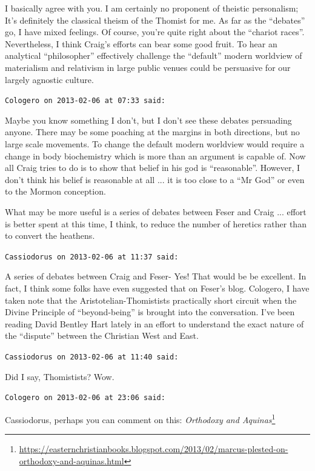 \begin{footnotesize}
\begin{sffamily}
I basically agree with you. I am certainly no proponent of theistic personalism; It's definitely the classical theism of the Thomist for me. As far as the ``debates'' go, I have mixed feelings. Of course, you're quite right about the ``chariot races''. Nevertheless, I think Craig's efforts can bear some good fruit. To hear an analytical ``philosopher'' effectively challenge the ``default'' modern worldview of materialism and relativism in large public venues could be persuasive for our largely agnostic culture.

\hfill

\texttt{Cologero on 2013-02-06 at 07:33 said:}

Maybe you know something I don't, but I don't see these debates persuading anyone. There may be some poaching at the margins in both directions, but no large scale movements. To change the default modern worldview would require a change in body biochemistry which is more than an argument is capable of. Now all Craig tries to do is to show that belief in his god is ``reasonable''. However, I don't think his belief is reasonable at all ... it is too close to a ``Mr God'' or even to the Mormon conception.

What may be more useful is a series of debates between Feser and Craig ... effort is better spent at this time, I think, to reduce the number of heretics rather than to convert the heathens.

\hfill

\texttt{Cassiodorus on 2013-02-06 at 11:37 said:}

A series of debates between Craig and Feser- Yes! That would be be excellent. In fact, I think some folks have even suggested that on Feser's blog. Cologero, I have taken note that the Aristotelian-Thomistists practically short circuit when the Divine Principle of ``beyond-being'' is brought into the conversation. I've been reading David Bentley Hart lately in an effort to understand the exact nature of the ``dispute'' between the Christian West and East.

\hfill

\texttt{Cassiodorus on 2013-02-06 at 11:40 said:}

Did I say, Thomistists? Wow.

\hfill

\texttt{Cologero on 2013-02-06 at 23:06 said:}

Cassiodorus, perhaps you can comment on this: \textit{Orthodoxy and Aquinas}\footnote{\url{https://easternchristianbooks.blogspot.com/2013/02/marcus-plested-on-orthodoxy-and-aquinas.html}}


\end{sffamily}
\end{footnotesize}

